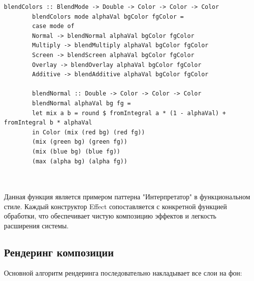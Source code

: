 \documentclass[a4paper,12pt]{article}
\begin{document}
	\begin{lstlisting}[caption=Алгоритмы смешивания цветов, label=lst:blend-algorithms]
		blendColors :: BlendMode -> Double -> Color -> Color -> Color
		blendColors mode alphaVal bgColor fgColor =
		case mode of
		Normal -> blendNormal alphaVal bgColor fgColor
		Multiply -> blendMultiply alphaVal bgColor fgColor
		Screen -> blendScreen alphaVal bgColor fgColor
		Overlay -> blendOverlay alphaVal bgColor fgColor
		Additive -> blendAdditive alphaVal bgColor fgColor
		
		blendNormal :: Double -> Color -> Color -> Color
		blendNormal alphaVal bg fg =
		let mix a b = round $ fromIntegral a * (1 - alphaVal) + fromIntegral b * alphaVal
		in Color (mix (red bg) (red fg))
		(mix (green bg) (green fg))
		(mix (blue bg) (blue fg))
		(max (alpha bg) (alpha fg))
		
		
	\end{lstlisting}
	
	Данная функция является примером паттерна "Интерпретатор" в функциональном стиле. Каждый конструктор Effect сопоставляется с конкретной функцией обработки, что обеспечивает чистую композицию эффектов и легкость расширения системы.
	
	\subsection{Рендеринг композиции}
	
	Основной алгоритм рендеринга последовательно накладывает все слои на фон:
	
\end{document}
